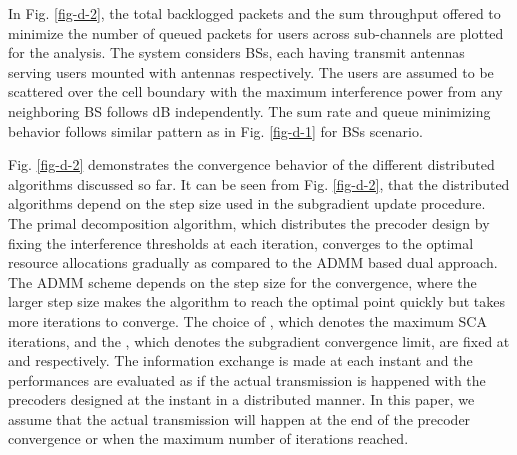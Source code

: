 In Fig. \ref{fig-d-2}, the total backlogged packets and the sum throughput offered to minimize the number of queued packets for  users across  sub-channels are plotted for the analysis. The system considers  \acp{BS}, each having  transmit antennas serving  users mounted with  antennas respectively. The users are assumed to be scattered over the cell boundary with the maximum interference power from any neighboring \ac{BS} follows  dB independently. The sum rate and queue minimizing behavior follows similar pattern as in Fig. \ref{fig-d-1} for  \acp{BS} scenario.

Fig. \ref{fig-d-2} demonstrates the convergence behavior of the different distributed algorithms discussed so far. It can be seen from Fig. \ref{fig-d-2}, that the distributed algorithms depend on the step size used in the subgradient update procedure. The primal decomposition algorithm, which distributes the precoder design by fixing the interference thresholds at each iteration, converges to the optimal resource allocations gradually as compared to the \ac{ADMM} based dual approach. The \ac{ADMM} scheme depends on the step size for the convergence, where the larger step size makes the algorithm to reach the optimal point quickly but takes more iterations to converge. The choice of , which denotes the maximum \ac{SCA} iterations, and the , which denotes the subgradient convergence limit, are fixed at  and  respectively. The information exchange is made at each instant and the performances are evaluated as if the actual transmission is happened with the precoders  designed at the  instant in a distributed manner. In this paper, we assume that the actual transmission will happen at the end of the precoder convergence or when the maximum number of iterations reached.

